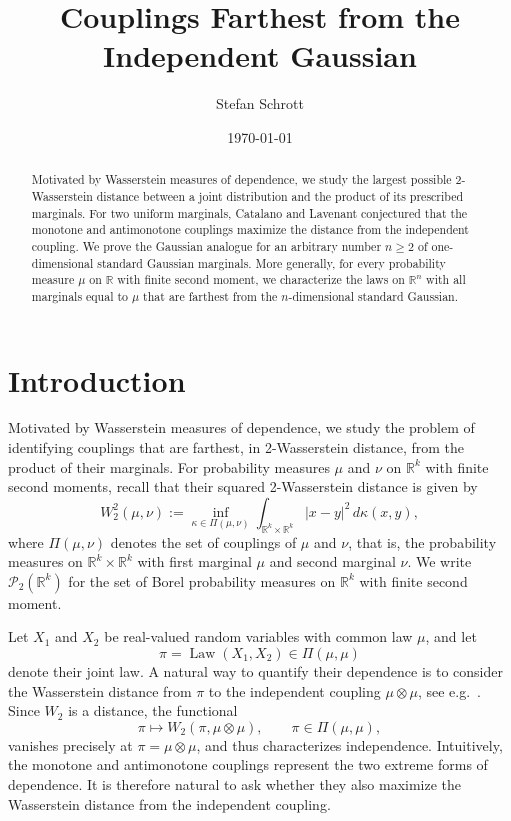 \documentclass[11pt]{amsart}
\title{Couplings Farthest from the Independent Gaussian}
\author{Stefan Schrott}
\date{\today}
\theoremstyle{definition}
\newcommand{\R}{\mathbb{R}}
\newcommand{\Pcal}{\mathcal{P}}
\newcommand{\Law}{\operatorname{Law}}
\newcommand{\W}{W}
\begin{document}
\begin{abstract}
Motivated by Wasserstein measures of dependence, we study the largest possible 2-Wasserstein distance between a joint distribution and the product of its prescribed marginals. For two uniform marginals, Catalano and Lavenant conjectured that the monotone and antimonotone couplings maximize the distance from the independent coupling. We prove the Gaussian analogue for an arbitrary number $n\geq 2$ of one-dimensional standard Gaussian marginals. More generally, for every probability measure $\mu$ on $\mathbb R$ with finite second moment, we characterize the laws on $\R^n$ with all marginals equal to $\mu$ that are farthest from the $n$-dimensional standard Gaussian.

\end{abstract}

\maketitle

\section{Introduction}
Motivated by Wasserstein measures of dependence, we study the problem
of identifying couplings that are farthest, in 2-Wasserstein
distance, from the product of their marginals. For probability measures
$\mu$ and $\nu$ on $\R^k$ with finite second moments, recall that their
squared 2-Wasserstein distance is given by
\[
  \W_2^2(\mu,\nu)
  :=
  \inf_{\kappa\in\Pi(\mu,\nu)}
  \int_{\R^k\times\R^k}|x-y|^2\,d\kappa(x,y),
\]
where $\Pi(\mu,\nu)$ denotes the set of couplings of $\mu$ and $\nu$,
that is, the probability measures on $\R^k\times\R^k$ with first
marginal $\mu$ and second marginal $\nu$. We write $\Pcal_2(\R^k)$ for the set of Borel probability measures on
$\R^k$ with finite second moment.

Let $X_1$ and $X_2$ be real-valued random variables with common law
$\mu$, and let
\[
  \pi=\Law(X_1,X_2)\in\Pi(\mu,\mu)
\]
denote their joint law. A natural way to quantify their dependence is
to consider the Wasserstein distance from $\pi$ to the independent
coupling $\mu\otimes\mu$, see e.g.\ \cite{CaLa25,MoSe22}. Since $\W_2$ is a
distance, the functional
\[
  \pi\longmapsto\W_2(\pi,\mu\otimes\mu),
  \qquad \pi\in\Pi(\mu,\mu),
\]
vanishes precisely at $\pi=\mu\otimes\mu$, and thus characterizes
independence. Intuitively, the monotone and antimonotone couplings
represent the two extreme forms of dependence. It is therefore natural
to ask whether they also maximize the Wasserstein distance from the
independent coupling.
\end{document}
